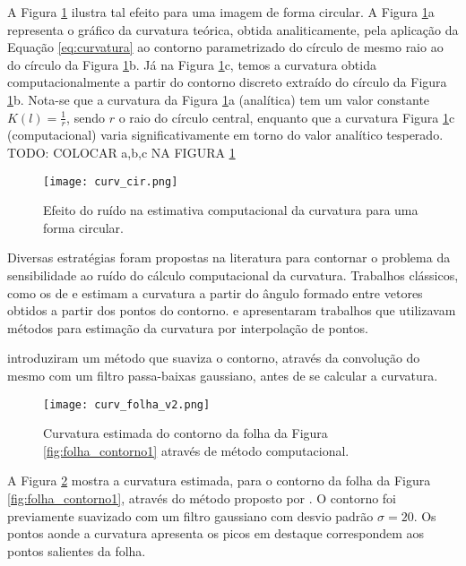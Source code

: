 A Figura \ref{fig:cir1} ilustra tal efeito para uma imagem de forma circular. A Figura \ref{fig:cir1}a representa o gráfico da curvatura teórica, obtida analiticamente, pela aplicação da Equação \ref{eq:curvatura} ao contorno parametrizado do círculo de mesmo raio ao do círculo da Figura \ref{fig:cir1}b. Já na  Figura \ref{fig:cir1}c, temos a curvatura obtida computacionalmente a partir do contorno discreto extraído do círculo da Figura \ref{fig:cir1}b. Nota-se que a curvatura da Figura \ref{fig:cir1}a (analítica) tem um valor constante $K(l) = \frac{1}{r}$, sendo $r$ o raio do círculo central, enquanto que a curvatura Figura \ref{fig:cir1}c (computacional) varia significativamente em torno do valor analítico tesperado.
\color {red}  TODO: COLOCAR a,b,c NA FIGURA \ref{fig:cir1} \color{black}

\begin{figure}[h!]
  \caption{\label{fig:cir1} Efeito do ruído na estimativa computacional da curvatura para uma forma circular.}
  \centering
  \texttt{[image: curv\_cir.png]}
\end{figure}

Diversas estratégias foram propostas na literatura para contornar o problema da sensibilidade ao ruído do cálculo computacional da curvatura. Trabalhos clássicos, como os de  e  estimam a curvatura a partir do ângulo formado entre vetores obtidos a partir dos pontos do contorno.  e  apresentaram trabalhos que utilizavam métodos para estimação da curvatura por interpolação de pontos. 

 introduziram um método que suaviza o contorno, através da convolução do mesmo com um filtro passa-baixas \color{red}gaussiano\color{black}, antes de se calcular a curvatura.

\begin{figure}[h!]
 \caption{\label{fig:curv_folha} Curvatura estimada do contorno da folha da Figura \ref{fig:folha_contorno1} através de método computacional.}
  \centering
  \texttt{[image: curv\_folha\_v2.png]}
\end{figure}

A Figura \ref{fig:curv_folha} mostra a curvatura estimada, para o contorno da folha da Figura \ref{fig:folha_contorno1}, através do método proposto por . O contorno foi previamente suavizado com um filtro gaussiano com desvio padrão $\sigma = 20$. Os pontos aonde a curvatura apresenta os picos em destaque correspondem aos pontos salientes da folha. 

